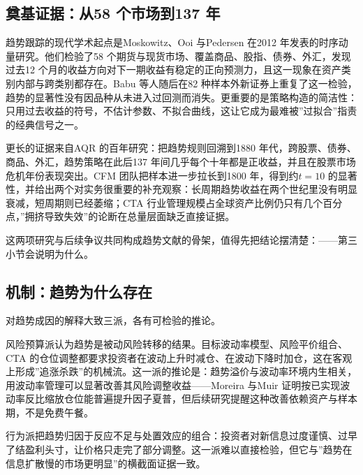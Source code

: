 \documentclass[12pt,a4paper]{ctexart}
\begin{document}
\subsection{奠基证据：从58 个市场到137 年}

趋势跟踪的现代学术起点是Moskowitz、Ooi 与Pedersen 在2012 年发表的时序动量研究\cite{03}。他们检验了58 个期货与现货市场、覆盖商品、股指、债券、外汇，发现过去12 个月的收益方向对下一期收益有稳定的正向预测力，且这一现象在资产类别内部与跨类别都存在。Babu 等人随后在82 种样本外新证券上重复了这一检验，趋势的显著性没有因品种从未进入过回测而消失\cite{14}。更重要的是策略构造的简洁性：只用过去收益的符号，不估计参数、不拟合曲线，这让它成为最难被”\hspace{0.3em}过拟合”\hspace{0.3em}指责的经典信号之一。


更长的证据来自AQR 的百年研究\cite{04}：把趋势规则回溯到1880 年代，跨股票、债券、商品、外汇，趋势策略在此后137 年间几乎每个十年都是正收益，并且在股票市场危机年份表现突出。CFM 团队把样本进一步拉长到1800 年\cite{05}，得到约$t = 10$ 的显著性，并给出两个对实务很重要的补充观察：长周期趋势收益在两个世纪里没有明显衰减，短周期则已经萎缩；CTA 行业管理规模占全球资产比例仍只有几个百分点，”\hspace{0.3em}拥挤导致失效”\hspace{0.3em}的论断在总量层面缺乏直接证据。


这两项研究与后续争议共同构成趋势文献的骨架，值得先把结论摆清楚：——第三小节会说明为什么。


\subsection{机制：趋势为什么存在}

对趋势成因的解释大致三派，各有可检验的推论。


风险预算派认为趋势是被动风险转移的结果。目标波动率模型、风险平价组合、CTA 的仓位调整都要求投资者在波动上升时减仓、在波动下降时加仓，这在客观上形成”\hspace{0.3em}追涨杀跌”\hspace{0.3em}的机械流。这一派的推论是：趋势溢价与波动率环境内生相关，用波动率管理可以显著改善其风险调整收益——Moreira 与Muir 证明按已实现波动率反比缩放仓位能普遍提升因子夏普\cite{08}，但后续研究提醒这种改善依赖资产与样本期，不是免费午餐\cite{09}。


行为派把趋势归因于反应不足与处置效应的组合：投资者对新信息过度谨慎、过早了结盈利头寸，让价格只走完了部分调整\cite{02}。这一派难以直接检验，但它与”\hspace{0.3em}趋势在信息扩散慢的市场更明显”\hspace{0.3em}的横截面证据一致。
\end{document}
